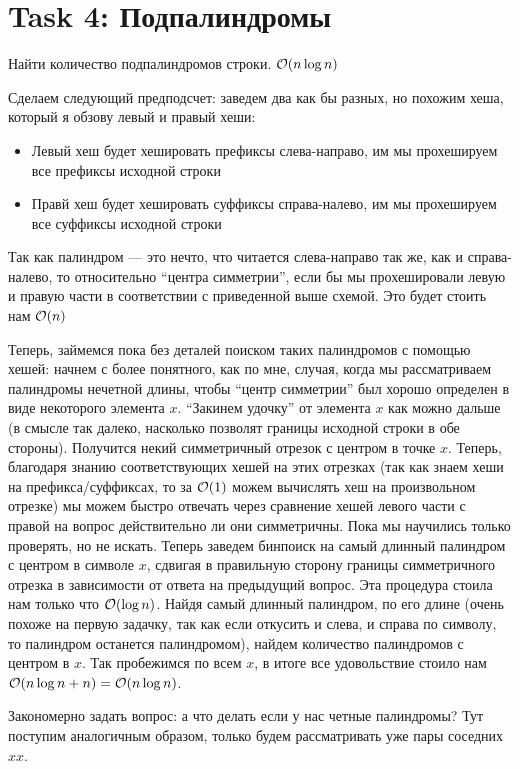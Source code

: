 \section{Task 4: Подпалиндромы}
\begin{task}
    Найти количество подпалиндромов строки. $\mathcal{O}(n\log n)$
\end{task}

\begin{solution}
    Сделаем следующий предподсчет: заведем два как бы разных, но похожим хеша, который я обзову левый и правый хеши:
    \begin{itemize}
        \item Левый хеш будет хешировать префиксы слева-направо, им мы прохешируем все префиксы исходной строки
        \item Правй хеш будет хешировать суффиксы справа-налево, им мы прохешируем все суффиксы исходной строки
    \end{itemize}
    Так как палиндром --- это нечто, что читается слева-направо так же, как и справа-налево, то относительно ``центра симметрии'', если бы мы прохешировали левую и правую части в соответствии с приведенной выше схемой. Это будет стоить нам $\mathcal{O}(n)$

    Теперь, займемся пока без деталей поиском таких палиндромов с помощью хешей: начнем с более понятного, как по мне, случая, когда мы рассматриваем палиндромы нечетной длины, чтобы ``центр симметрии'' был хорошо определен в виде некоторого элемента $x$.
    ``Закинем удочку'' от элемента $x$ как можно дальше (в смысле так далеко, насколько позволят границы исходной строки в обе стороны). Получится некий симметричный отрезок с центром в точке $x$.
    Теперь, благодаря знанию соответствующих хешей на этих отрезках (так как знаем хеши на префикса/суффиксах, то за $\mathcal{O}(1)$ можем вычислять хеш на произвольном отрезке) мы можем быстро отвечать через сравнение хешей левого части с правой на вопрос действительно ли они симметричны.
    Пока мы научились только проверять, но не искать.
    Теперь заведем бинпоиск на самый длинный палиндром с центром в символе $x$, сдвигая в правильную сторону границы симметричного отрезка в зависимости от ответа на предыдущий вопрос.
    Эта процедура стоила нам только что $\mathcal{O}(\log n)$.
    Найдя самый длинный палиндром, по его длине (очень похоже на первую задачку, так как если откусить и слева, и справа по символу, то палиндром останется палиндромом), найдем количество палиндромов с центром в $x$.
    Так пробежимся по всем $x$, в итоге все удовольствие стоило нам $\mathcal{O}(n\log n + n) = \mathcal{O}(n\log n)$.

    Закономерно задать вопрос: а что делать если у нас четные палиндромы? Тут поступим аналогичным образом, только будем рассматривать уже пары соседних $xx$.

\end{solution}

